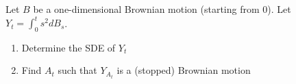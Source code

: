 Let $B$ be a one-dimensional Brownian motion (starting from $0$). Let $Y_t=\int_0^t s^2dB_s$.
\begin{enumerate}
    \item Determine the SDE of $Y_t$
    \item Find $A_t$ such that $Y_{A_t}$ is a (stopped) Brownian motion 
\end{enumerate}